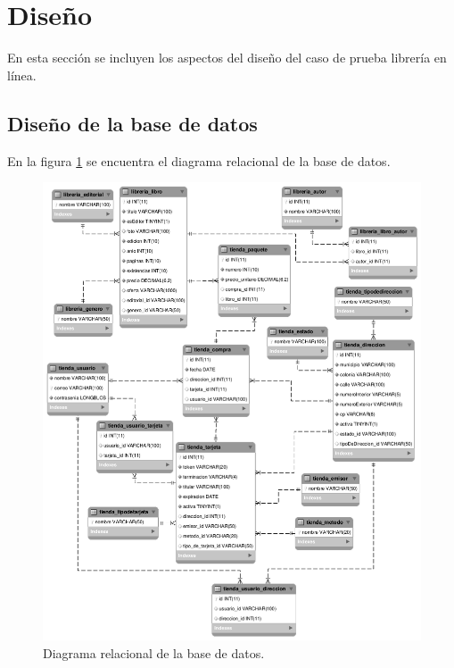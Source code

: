 %
%

\section{Diseño}
En esta sección se incluyen los aspectos del diseño del caso de prueba
librería en línea.

\subsection{Diseño de la base de datos}
En la figura \ref{lib_fig:relacional} se encuentra el diagrama relacional de
la base de datos.

\begin{figure}
  \begin{center}
    \includegraphics[width=1.0\linewidth]{diagramas/relacional.png}
    \caption{Diagrama relacional de la base de datos.}
    \label{lib_fig:relacional}
  \end{center}
\end{figure}

